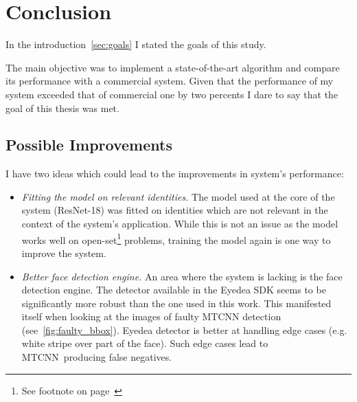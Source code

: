 \chapter{Conclusion}\label{ch:conclusion}
In the introduction~\ref{sec:goals} I stated the goals of this study.

The main objective was to implement a state-of-the-art algorithm and compare its performance with a commercial system.
Given that the performance of my system exceeded that of commercial one by two percents I dare to say that the
goal of this thesis was met.

\section{Possible Improvements}\label{sec:possible-improvements}
I have two ideas which could lead to the improvements in system's performance:
\begin{itemize}
    \item \textit{Fitting the model on relevant identities.} The model used at the core of the system (ResNet-18) was
    fitted on identities which are not relevant in the context of the system's application.
    While this is not an issue as the model works well on open-set\footnote{See footnote on page~\pageref{foot:openset}}
    problems, training the model again is one way to improve the system.
    \item \textit{Better face detection engine.} An area where the system is lacking is the face detection engine.
    The detector available in the Eyedea SDK seems to be significantly more robust than the one used in this work.
    This manifested itself when looking at the images of faulty MTCNN detection (see~\ref{fig:faulty_bbox}).
    Eyedea detector is better at handling edge cases (e.g. white stripe over part of the face).
    Such edge cases lead to MTCNN producing false negatives.
\end{itemize}